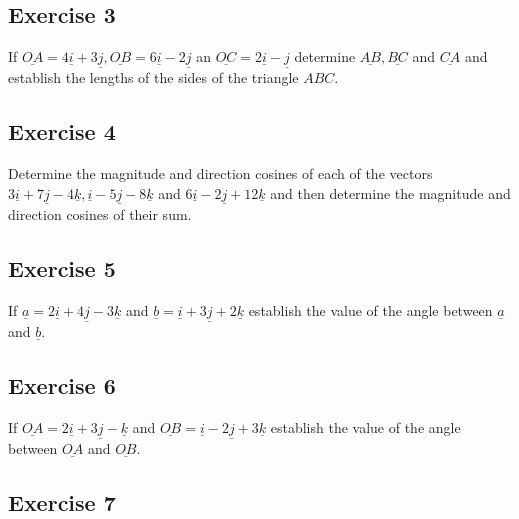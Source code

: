 \documentclass[
  english,
  11pt,
  oneside]{book}
\newcommand{\slide}{}
\theoremstyle{definition}
\theoremstyle{definition}
\theoremstyle{definition}
\theoremstyle{definition}
\theoremstyle{remark}
\begin{document}
\slide

\subsection*{Exercise 3}\label{exercise-3-11}

If \(\underline{OA} = 4\underline{i}+3\underline{j}, \underline{OB}=6\underline{i}-2\underline{j}\) an \(\underline{OC}=2\underline{i}-\underline{j}\) determine \(\underline{AB}, \underline{BC}\) and \(\underline{CA}\) and establish the lengths of the sides of the triangle \(ABC\).

\slide

\subsection*{Exercise 4}\label{exercise-4-9}

Determine the magnitude and direction cosines of each of the vectors \(3\underline{i}+7\underline{j}-4\underline{k}, \underline{i}-5\underline{j}-8\underline{k}\) and \(6\underline{i}-2\underline{j}+12\underline{k}\) and then determine the magnitude and direction cosines of their sum.

\slide

\subsection*{Exercise 5}\label{exercise-5-7}

If \(\underline a=2\underline{i}+4\underline{j}-3\underline{k}\) and \(\underline b=\underline{i}+3\underline{j}+2\underline{k}\) establish the value of the angle between \(\underline a\) and \(\underline b\).

\slide

\subsection*{Exercise 6}\label{exercise-6-5}

If \(\underline{OA}=2\underline{i}+3\underline{j}-\underline{k}\) and \(\underline{OB}=\underline{i}-2\underline{j}+3\underline{k}\) establish the value of the angle between \(\underline{OA}\) and \(\underline{OB}\).

\slide

\subsection*{Exercise 7}\label{exercise-7-2}
\end{document}
